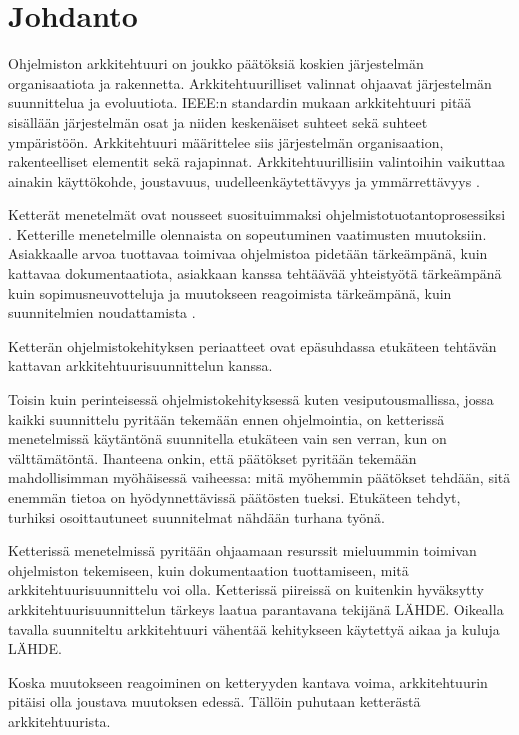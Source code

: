 \chapter{Johdanto}


Ohjelmiston arkkitehtuuri on joukko päätöksiä koskien järjestelmän organisaatiota ja rakennetta. Arkkitehtuurilliset valinnat ohjaavat järjestelmän suunnittelua ja evoluutiota. IEEE:n standardin\citep{jen_working_2000} mukaan arkkitehtuuri pitää sisällään järjestelmän osat ja niiden keskenäiset suhteet sekä suhteet ympäristöön. Arkkitehtuuri määrittelee siis järjestelmän organisaation, rakenteelliset elementit sekä rajapinnat. Arkkitehtuurillisiin valintoihin vaikuttaa ainakin käyttökohde, joustavuus, uudelleenkäytettävyys ja ymmärrettävyys \citep{kruchten2004rational}.

Ketterät menetelmät ovat nousseet suosituimmaksi ohjelmistotuotantoprosessiksi \citep{noauthor_14th_2020}. Ketterille menetelmille olennaista on sopeutuminen vaatimusten muutoksiin. Asiakkaalle arvoa tuottavaa toimivaa ohjelmistoa pidetään tärkeämpänä, kuin kattavaa dokumentaatiota, asiakkaan kanssa tehtäävää yhteistyötä tärkeämpänä kuin sopimusneuvotteluja ja muutokseen reagoimista tärkeämpänä, kuin suunnitelmien noudattamista \citep{fowler2001agile}.

Ketterän ohjelmistokehityksen periaatteet ovat epäsuhdassa etukäteen tehtävän kattavan arkkitehtuurisuunnittelun kanssa.

Toisin kuin perinteisessä ohjelmistokehityksessä kuten vesiputousmallissa, jossa kaikki suunnittelu pyritään tekemään ennen ohjelmointia, on ketterissä menetelmissä käytäntönä suunnitella etukäteen vain sen verran, kun on välttämätöntä. Ihanteena onkin, että päätökset pyritään tekemään mahdollisimman myöhäisessä vaiheessa: mitä myöhemmin päätökset tehdään, sitä enemmän tietoa on hyödynnettävissä päätösten tueksi. Etukäteen tehdyt, turhiksi osoittautuneet suunnitelmat nähdään turhana työnä.

Ketterissä menetelmissä pyritään ohjaamaan resurssit mieluummin toimivan ohjelmiston tekemiseen, kuin dokumentaation tuottamiseen, mitä arkkitehtuurisuunnittelu voi olla. Ketterissä piireissä on kuitenkin hyväksytty arkkitehtuurisuunnittelun tärkeys laatua parantavana tekijänä LÄHDE. Oikealla tavalla suunniteltu arkkitehtuuri vähentää kehitykseen käytettyä aikaa ja kuluja LÄHDE. 

Koska muutokseen reagoiminen on ketteryyden kantava voima, arkkitehtuurin pitäisi olla joustava muutoksen edessä. Tällöin puhutaan ketterästä arkkitehtuurista.

